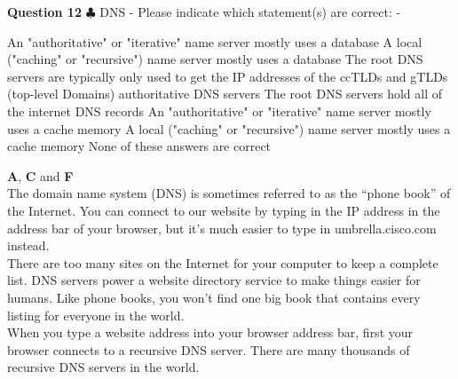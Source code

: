 \documentclass[en]{sourcefiles/eplexam}
\newcounter{choice}
\renewcommand\thechoice{\textbf{\Alph{choice}}}
\newcommand\choicelabel{\thechoice$\quad$}
\newenvironment{choices}%
  {\list{\choicelabel}%
     {\usecounter{choice}\def\makelabel##1{\hss\llap{##1}}%
       \settowidth{\leftmargin}{W.\hskip\labelsep\hskip 2.5em}%
       \def\choice{%
         \item
       } %
       \labelwidth\leftmargin\advance\labelwidth-\labelsep
       \topsep=0pt
       \partopsep=0pt
     }%
  }%
  {\endlist}
\begin{document}
\textbf{Question 12} $\clubsuit$ DNS - Please indicate which statement(s) are correct:
\begin{choices}
     \choice An "authoritative" or "iterative" name server mostly uses a database
     \choice A local ("caching" or "recursive") name server mostly uses a database
     \choice The root DNS servers are typically only used to get the IP addresses of the ccTLDs and gTLDs (top-level Domains) authoritative DNS servers
     \choice The root DNS servers hold all of the internet DNS records
     \choice An "authoritative" or "iterative" name server mostly uses a cache memory
     \choice A local ("caching" or "recursive") name server mostly uses a cache memory
    \choice None of these answers are correct
\end{choices}
\begin{solution}
\textbf{A}, \textbf{C} and \textbf{F}\\




\noindent The domain name system (DNS) is sometimes referred to as the “phone book” of the Internet.  You can connect to our website by typing in the IP address in the address bar of your browser, but it’s much easier to type in umbrella.cisco.com instead.\\

\noindent There are too many sites on the Internet for your computer to keep a complete list. DNS servers power a website directory service to make things easier for humans. Like phone books, you won’t find one big book that contains every listing for everyone in the world.\\

\noindent When you type a website address into your browser address bar, first your browser connects to a recursive DNS server. There are many thousands of recursive DNS servers in the world.\\


\end{solution}
\end{document}
